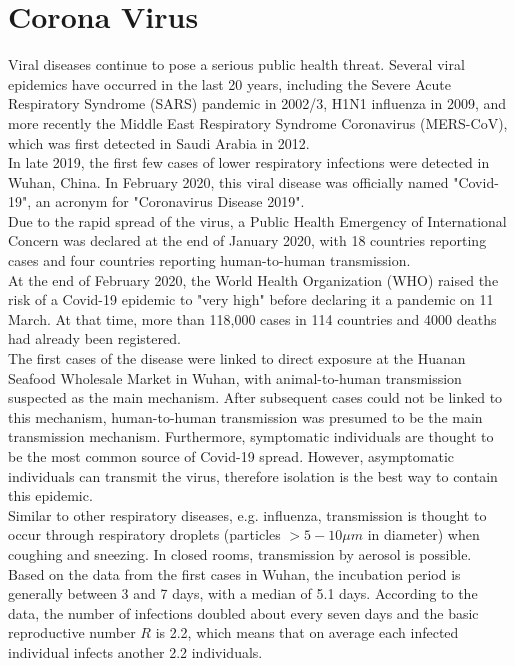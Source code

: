 \section{Corona Virus}
\label{sec:corona}
Viral diseases continue to pose a serious public health threat. Several viral epidemics have occurred in the last 20 years, including the Severe Acute Respiratory Syndrome (SARS) pandemic in 2002/3, H1N1 influenza in 2009, and more recently the Middle East Respiratory Syndrome Coronavirus (MERS-CoV), which was first detected in Saudi Arabia in 2012. \\
In late 2019, the first few cases of lower respiratory infections were detected in Wuhan, China. In February 2020, this viral disease was officially named "Covid-19", an acronym for "Coronavirus Disease 2019". \\
Due to the rapid spread of the virus, a Public Health Emergency of International Concern was declared at the end of January 2020, with 18 countries reporting cases and four countries reporting human-to-human transmission. \\
At the end of February 2020, the World Health Organization (WHO) raised the risk of a Covid-19 epidemic to "very high" before declaring it a pandemic on 11 March. At that time, more than 118,000 cases in 114 countries and 4000 deaths had already been registered. \\
The first cases of the disease were linked to direct exposure at the Huanan Seafood Wholesale Market in Wuhan, with animal-to-human transmission suspected as the main mechanism. After subsequent cases could not be linked to this mechanism, human-to-human transmission was presumed to be the main transmission mechanism. Furthermore, symptomatic individuals are thought to be the most common source of Covid-19 spread. However, asymptomatic individuals can transmit the virus, therefore isolation is the best way to contain this epidemic. \\
Similar to other respiratory diseases, e.g. influenza, transmission is thought to occur through respiratory droplets (particles $>5-10\mu m$ in diameter) when coughing and sneezing. In closed rooms, transmission by aerosol is possible. \\
Based on the data from the first cases in Wuhan, the incubation period is generally between 3 and 7 days, with a median of 5.1 days. According to the data, the number of infections doubled about every seven days and the basic reproductive number $R$ is 2.2, which means that on average each infected individual infects another 2.2 individuals. \\
